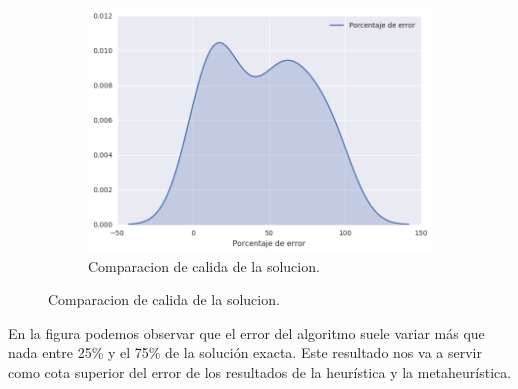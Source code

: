\begin{figure}[H]
  \begin{center}	
    \begin{subfigure}[b]{0.60\textwidth}
        \includegraphics[width=\textwidth]{img/ejercicio2/losPosta/grafico_distribucion.png}
        \caption{Comparacion de calida de la solucion.}
        \label{fig: ejercicio1_ejemplo_camino1_2}
    \end{subfigure}
  \end{center}
\end{figure}

En la figura podemos observar que el error del algoritmo suele variar m\'as que nada entre 25\% y el 75\% de la soluci\'on exacta. Este resultado nos va a servir como cota superior del error de los resultados de la heur\'istica y la metaheur\'istica.